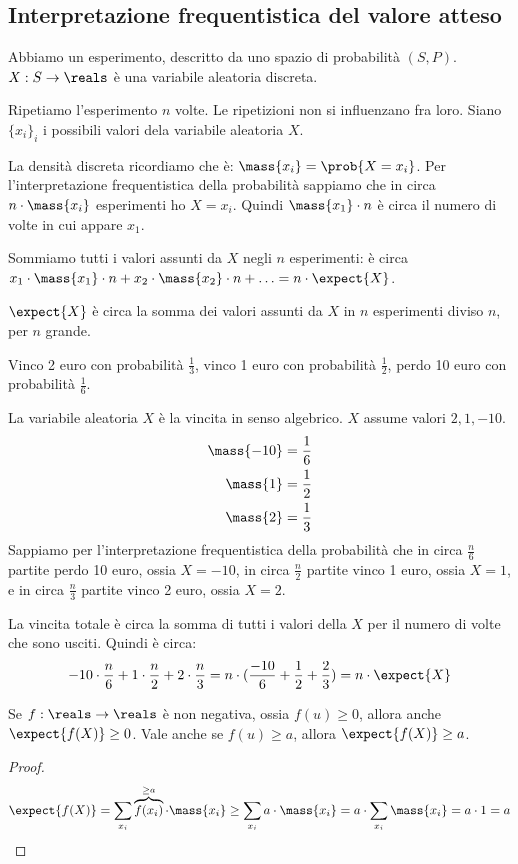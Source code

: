 \subsection{Interpretazione frequentistica del valore atteso}

Abbiamo un esperimento, descritto da uno spazio di probabilit\`a $(S, P)$. $X : S \to \reals$ \`e una variabile aleatoria discreta.

Ripetiamo l'esperimento $n$ volte. Le ripetizioni non si influenzano fra loro. Siano $\{ x_i \}_{i}$ i possibili valori dela variabile aleatoria $X$.

La densit\`a discreta ricordiamo che \`e: $\mass{x_i} = \prob{X = x_i}$. Per l'interpretazione frequentistica della probabilit\`a sappiamo che in circa $n \cdot \mass{x_i}$ esperimenti ho $X = x_i$. Quindi $\mass{x_1} \cdot n$ \`e circa il numero di volte in cui appare $x_1$.

Sommiamo tutti i valori assunti da $X$ negli $n$ esperimenti: \`e circa $x_1 \cdot \mass{x_1} \cdot n + x_2 \cdot \mass{x_2} \cdot n + \ldots = n \cdot \expect{X}$.

$\expect{X}$ \`e circa la somma dei valori assunti da $X$ in $n$ esperimenti diviso $n$, per $n$ grande.

\begin{exmp}
Vinco 2 euro con probabilit\`a $\frac{1}{3}$, vinco 1 euro con probabilit\`a $\frac{1}{2}$, perdo 10 euro con probabilit\`a $\frac{1}{6}$.

La variabile aleatoria $X$ \`e la vincita in senso algebrico. $X$ assume valori $2, 1, -10$.
\begin{align*}
\mass{-10} &= \frac{1}{6} \\
\mass{1} &= \frac{1}{2} \\
\mass{2} &= \frac{1}{3}
\end{align*}
Sappiamo per l'interpretazione frequentistica della probabilit\`a che in circa $\frac{n}{6}$ partite perdo 10 euro, ossia $X = -10$, in circa $\frac{n}{2}$ partite vinco 1 euro, ossia $X = 1$, e in circa $\frac{n}{3}$ partite vinco 2 euro, ossia $X = 2$.

La vincita totale \`e circa la somma di tutti i valori della $X$ per il numero di volte che sono usciti. Quindi \`e circa:
\[
-10 \cdot \frac{n}{6} + 1 \cdot \frac{n}{2} + 2 \cdot \frac{n}{3} =
n \cdot (\frac{-10}{6} + \frac{1}{2} + \frac{2}{3}) = n \cdot \expect{X}
\]
\end{exmp}
\begin{fact}\label{valore_atteso_non_negativo}
Se $f : \reals \to \reals$ \`e non negativa, ossia $f(u) \ge 0$, allora anche $\expect{f(X)} \ge 0$. Vale anche se $f(u) \ge a$, allora $\expect{f(X)} \ge a$.
\end{fact}
\begin{proof}
\[
\expect{f(X)} = \sum_{x_i} \overbrace{f(x_i)}^{\ge a} \cdot \mass{x_i} \ge \sum_{x_i} a \cdot \mass{x_i} = a \cdot \sum_{x_i} \mass{x_i} = a \cdot 1 = a
\]
\end{proof}

